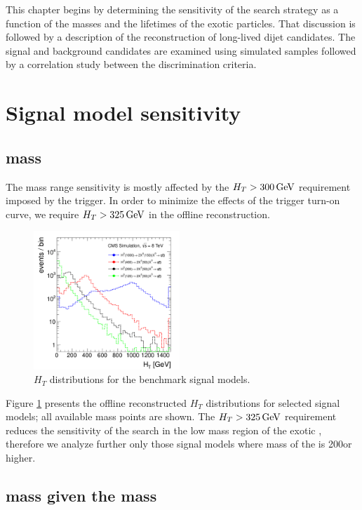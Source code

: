 This chapter begins by determining the sensitivity of the search strategy as a function
of the masses and the lifetimes
of the exotic particles. That discussion is followed by a description
of the reconstruction of long-lived dijet candidates.
The signal and background candidates are examined using simulated samples followed by 
a correlation study between the discrimination criteria.

\section{Signal model sensitivity}
\label{sec:sigsensitivity}

\subsection{\Higgs mass}

The \Higgs mass range sensitivity is mostly affected by the $H_T>300\,\text{Ge\hspace{-.08em}V}$ requirement imposed by the trigger. 
In order to minimize the effects of the trigger turn-on curve,
we require $H_T>325\,\text{Ge\hspace{-.08em}V}$ in the offline reconstruction.

\begin{figure}[htbp]
\centering
\includegraphics[width=0.49\textwidth]{plots/signal/ht.pdf}
\caption{$H_T$ distributions for the benchmark signal models.\label{fig:sight}}
\end{figure}

Figure \ref{fig:sight} presents the offline reconstructed $H_T$ distributions 
for selected signal models; all available \Higgs 
mass points are shown.
The $H_T>325\,\text{Ge\hspace{-.08em}V}$ requirement reduces the sensitivity of the search in the low mass region of the exotic \Higgs,
therefore we analyze further only those signal models where mass of the \Higgs is 200\GeV or higher.

\subsection{\X mass given the \Higgs mass}

